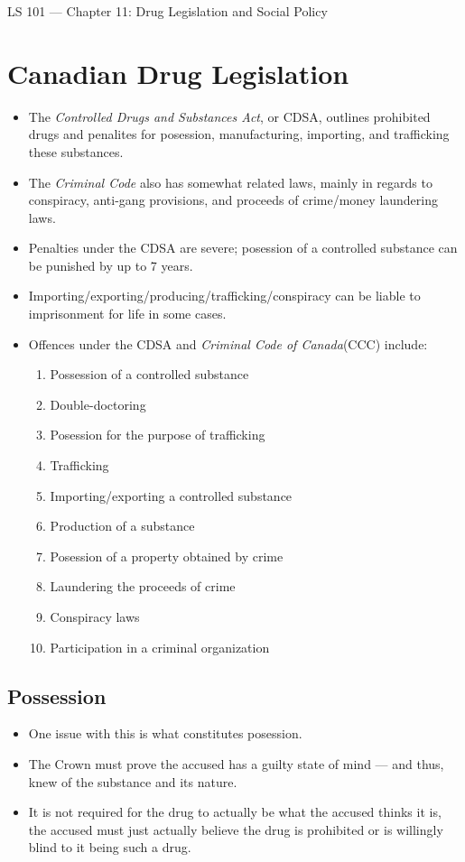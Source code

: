 \documentclass{article}
\author{Clement Tsang}
\begin{document}
\begin{center}
    \Large{LS 101 --- Chapter 11: Drug Legislation and Social Policy}
\end{center}

\section{Canadian Drug Legislation}
\begin{itemize}
    \item The \emph{Controlled Drugs and Substances Act}, or CDSA, outlines prohibited drugs and penalites for posession, manufacturing, importing, and trafficking these substances.
    \item The \emph{Criminal Code} also has somewhat related laws, mainly in regards to conspiracy, anti-gang provisions, and proceeds of crime/money laundering laws.
    \item Penalties under the CDSA are severe; posession of a controlled substance can be punished by up to 7 years.
    \item Importing/exporting/producing/trafficking/conspiracy can be liable to imprisonment for life in some cases.
    \item Offences under the CDSA and \emph{Criminal Code of Canada}(CCC) include:
        \begin{enumerate}
            \item Possession of a controlled substance
            \item Double-doctoring
            \item Posession for the purpose of trafficking
            \item Trafficking
            \item Importing/exporting a controlled substance
            \item Production of a substance
            \item Posession of a property obtained by crime
            \item Laundering the proceeds of crime
            \item Conspiracy laws
            \item Participation in a criminal organization
        \end{enumerate}
\end{itemize}

\subsection{Possession}
\begin{itemize}
    \item One issue with this is what constitutes posession.
    \item The Crown must prove the accused has a guilty state of mind --- and thus, knew of the substance and its nature.
    \item It is not required for the drug to actually be what the accused thinks it is, the accused must just actually believe the drug is prohibited or is willingly blind to it being such a drug.
\end{itemize}
\end{document}

